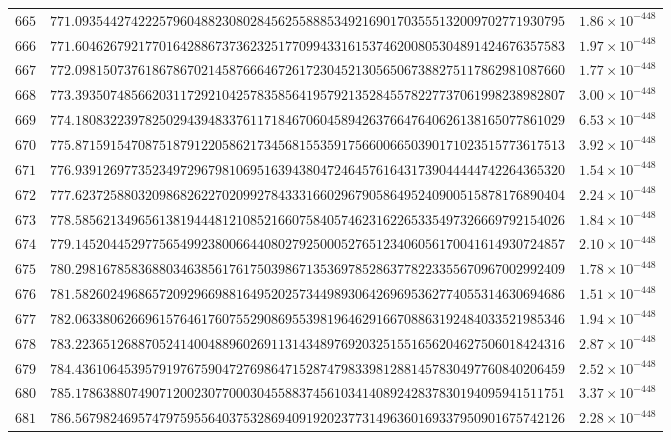 \documentclass[12pt,reqno]{amsart}
\theoremstyle{remark}
\begin{document}
\begin{longtable}{clc}
$665$ & $771.0935442742225796048823080284562558885349216901703555132009702771930795$ & $1.86\times 10^{-448}$ \\
$666$ & $771.6046267921770164288673736232517709943316153746200805304891424676357583$ & $1.97\times 10^{-448}$ \\
$667$ & $772.0981507376186786702145876664672617230452130565067388275117862981087660$ & $1.77\times 10^{-448}$ \\
$668$ & $773.3935074856620311729210425783585641957921352845578227737061998238982807$ & $3.00\times 10^{-448}$ \\
$669$ & $774.1808322397825029439483376117184670604589426376647640626138165077861029$ & $6.53\times 10^{-448}$ \\
$670$ & $775.8715915470875187912205862173456815535917566006650390171023515773617513$ & $3.92\times 10^{-448}$ \\
$671$ & $776.9391269773523497296798106951639438047246457616431739044444742264365320$ & $1.54\times 10^{-448}$ \\
$672$ & $777.6237258803209868262270209927843331660296790586495240900515878176890404$ & $2.24\times 10^{-448}$ \\
$673$ & $778.5856213496561381944481210852166075840574623162265335497326669792154026$ & $1.84\times 10^{-448}$ \\
$674$ & $779.1452044529775654992380066440802792500052765123406056170041614930724857$ & $2.10\times 10^{-448}$ \\
$675$ & $780.2981678583688034638561761750398671353697852863778223355670967002992409$ & $1.78\times 10^{-448}$ \\
$676$ & $781.5826024968657209296698816495202573449893064269695362774055314630694686$ & $1.51\times 10^{-448}$ \\
$677$ & $782.0633806266961576461760755290869553981964629166708863192484033521985346$ & $1.94\times 10^{-448}$ \\
$678$ & $783.2236512688705241400488960269113143489769203251551656204627506018424316$ & $2.87\times 10^{-448}$ \\
$679$ & $784.4361064539579197675904727698647152874798339812881457830497760840206459$ & $2.52\times 10^{-448}$ \\
$680$ & $785.1786388074907120023077000304558837456103414089242837830194095941511751$ & $3.37\times 10^{-448}$ \\
$681$ & $786.5679824695747975955640375328694091920237731496360169337950901675742126$ & $2.28\times 10^{-448}$ \\

\end{longtable}
\end{document}
